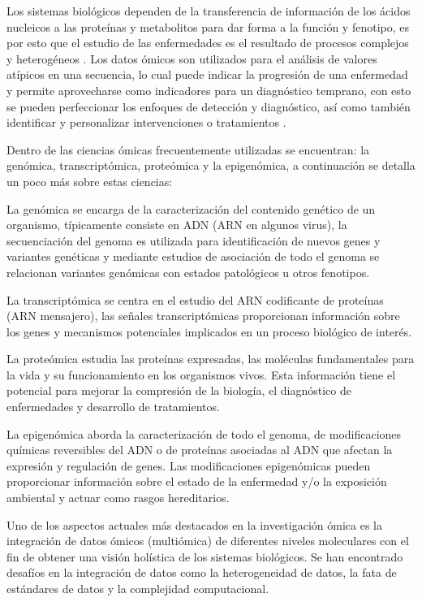 Los sistemas biológicos dependen de la transferencia de información de los ácidos nucleicos a las proteínas y metabolitos para dar forma a la función y fenotipo, es por esto que el estudio de las enfermedades es el resultado de procesos complejos y heterogéneos \citep{kim2018data}. Los datos ómicos son utilizados para el análisis de valores atípicos en una secuencia, lo cual puede indicar la progresión de una enfermedad y permite aprovecharse como indicadores para un diagnóstico temprano, con esto se pueden perfeccionar los enfoques de detección y diagnóstico, así como también identificar y personalizar intervenciones o tratamientos \citep{krassowski2020state}.

Dentro de las ciencias ómicas frecuentemente utilizadas se encuentran: la genómica, transcriptómica, proteómica y la epigenómica, a continuación se detalla un poco más sobre estas ciencias:

La genómica se encarga de la caracterización del contenido genético de un organismo, típicamente consiste en ADN (ARN en algunos virus), la secuenciación del genoma es utilizada para identificación de nuevos genes y variantes genéticas y mediante estudios de asociación de todo el genoma se relacionan variantes genómicas con estados patológicos u otros fenotipos.

La transcriptómica se centra en el estudio del ARN codificante de proteínas (ARN mensajero), las señales transcriptómicas proporcionan información sobre los genes y mecanismos potenciales implicados en un proceso biológico de interés.

La proteómica estudia las proteínas expresadas, las moléculas fundamentales para la vida y su funcionamiento en los organismos vivos. Esta información tiene el potencial para mejorar la compresión de la biología, el diagnóstico de enfermedades y desarrollo de tratamientos.

La epigenómica aborda la caracterización de todo el genoma, de modificaciones químicas reversibles del ADN o de proteínas asociadas al ADN que afectan la expresión y regulación de genes. Las modificaciones epigenómicas pueden proporcionar información sobre el estado de la enfermedad y/o la exposición ambiental y actuar como rasgos hereditarios.

Uno de los aspectos actuales más destacados en la investigación ómica es la integración de datos ómicos (multiómica) de diferentes niveles moleculares con el fin de obtener una visión holística de los sistemas biológicos. Se han encontrado desafíos en la integración de datos como la heterogeneidad de datos, la fata de estándares de datos y la complejidad computacional.

